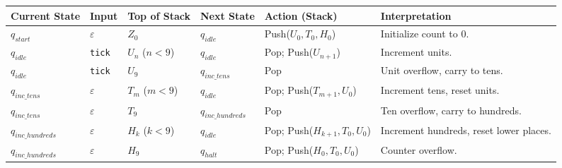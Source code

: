 \documentclass[12pt]{book}
\begin{document}
\begin{longtable}[]{@{}
  >{\raggedright\arraybackslash}p{}
  >{\raggedright\arraybackslash}p{}
  >{\raggedright\arraybackslash}p{}
  >{\raggedright\arraybackslash}p{}
  >{\raggedright\arraybackslash}p{}
  >{\raggedright\arraybackslash}p{}@{}}
\toprule\noalign{}
\begin{minipage}[b]{\linewidth}\raggedright
Current State
\end{minipage} & \begin{minipage}[b]{\linewidth}\raggedright
Input
\end{minipage} & \begin{minipage}[b]{\linewidth}\raggedright
Top of Stack
\end{minipage} & \begin{minipage}[b]{\linewidth}\raggedright
Next State
\end{minipage} & \begin{minipage}[b]{\linewidth}\raggedright
Action (Stack)
\end{minipage} & \begin{minipage}[b]{\linewidth}\raggedright
Interpretation
\end{minipage} \\
\midrule\noalign{}
\endhead
\bottomrule\noalign{}
\endlastfoot
\(q_{start}\) & \(\varepsilon\) & \(Z_0\) & \(q_{idle}\) &
Push(\(U_0, T_0, H_0\)) & Initialize count to 0. \\
\(q_{idle}\) & \texttt{tick} & \(U_n\) (\(n<9\)) & \(q_{idle}\) & Pop;
Push(\(U_{n+1}\)) & Increment units. \\
\(q_{idle}\) & \texttt{tick} & \(U_9\) & \(q_{inc\_tens}\) & Pop & Unit
overflow, carry to tens. \\
\(q_{inc\_tens}\) & \(\varepsilon\) & \(T_m\) (\(m<9\)) & \(q_{idle}\) &
Pop; Push(\(T_{m+1}, U_0\)) & Increment tens, reset units. \\
\(q_{inc\_tens}\) & \(\varepsilon\) & \(T_9\) & \(q_{inc\_hundreds}\) &
Pop & Ten overflow, carry to hundreds. \\
\(q_{inc\_hundreds}\) & \(\varepsilon\) & \(H_k\) (\(k<9\)) &
\(q_{idle}\) & Pop; Push(\(H_{k+1}, T_0, U_0\)) & Increment hundreds,
reset lower places. \\
\(q_{inc\_hundreds}\) & \(\varepsilon\) & \(H_9\) & \(q_{halt}\) & Pop;
Push(\(H_0, T_0, U_0\)) & Counter overflow. \\
\end{longtable}
\end{document}
